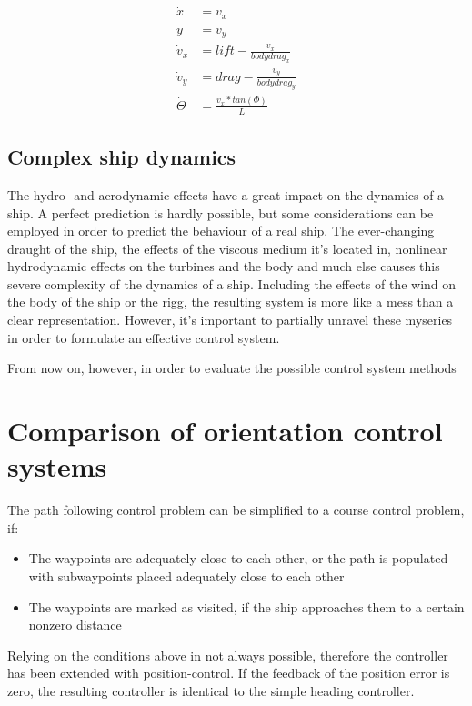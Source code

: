 \begin{align}
		\dot{x} &= v_x
	\\	\dot{y} &= v_y
	\\	\dot{v}_x &= lift - \frac{v_x}{bodydrag_x}
	\\	\dot{v}_y &= drag - \frac{v_y}{bodydrag_y}
	\\	\dot{\Theta} &= \frac{v_x * tan(\Phi)}{L}
\end{align}

\subsection{Complex ship dynamics}

The hydro- and aerodynamic effects have a great impact on the dynamics of a ship. A perfect prediction is hardly possible, but some considerations can be employed in order to predict the behaviour of a real ship.
The ever-changing draught of the ship, the effects of the viscous medium it’s located in, nonlinear hydrodynamic effects on the turbines and the body and much else causes this severe complexity of the dynamics of a ship. Including the effects of the wind on the body of the ship or the rigg, the resulting system is more like a mess than a clear representation.
However, it’s important to partially unravel these myseries in order to formulate an effective control system.

From now on, however, in order to evaluate the possible control system methods 

\section{Comparison of orientation control systems}

The path following control problem can be simplified to a course control problem, if:

\begin{itemize}

	\item The waypoints are adequately close to each other, or the path is populated with subwaypoints placed adequately close to each other
	\item The waypoints are marked as visited, if the ship approaches them to a certain nonzero distance

\end{itemize}

Relying on the conditions above in not always possible, therefore the controller has been extended with position-control. If the feedback of the position error is zero, the resulting controller is identical to the simple heading controller.

